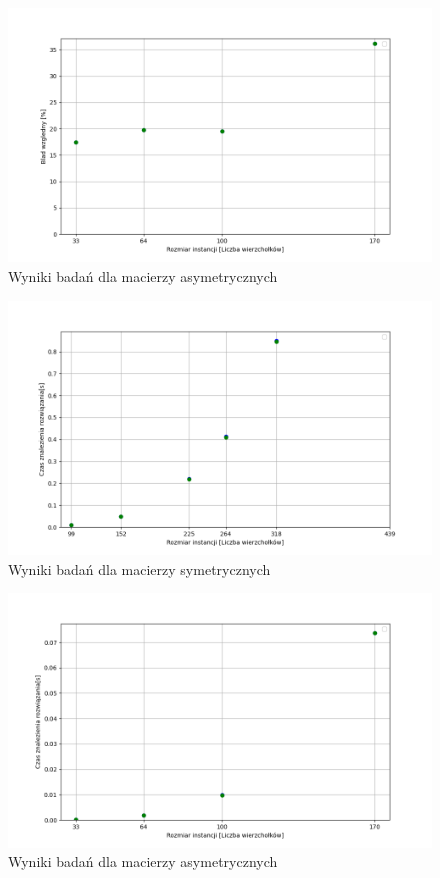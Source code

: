 \documentclass{article}
\begin{document}
        \begin{figure}[ht]
          \centering
          \includegraphics[width=\textwidth]{src/plots/asymAoFeroMet.png}
          \caption{Wyniki badań dla macierzy asymetrycznych}
          \label{fig:asymFero}
        \end{figure}
        \FloatBarrier
        
        \FloatBarrier
        \begin{figure}[ht]
          \centering
          \includegraphics[width=\textwidth]{src/plots/symAoFeroMetTime.png}
          \caption{Wyniki badań dla macierzy symetrycznych}
          \label{fig:symFeroT}
        \end{figure}
        \begin{figure}[ht]
          \centering
          \includegraphics[width=\textwidth]{src/plots/asymAoFeroMetTime.png}
          \caption{Wyniki badań dla macierzy asymetrycznych}
          \label{fig:asymFeroT}
        \end{figure}
\end{document}
